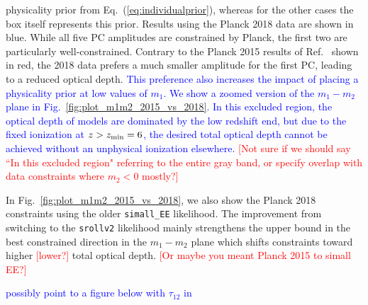 \documentclass[prd,twocolumn,amsmath,amssymb,floatfix,superscriptaddress,nofootinbib]{revtex4-1}
\newcommand{\wh}[1]{\textcolor{blue}{#1}}
\newcommand{\ch}[1]{\textcolor{red}{#1}}
\begin{document}
physicality prior from Eq.~(\ref{eq:individualprior}), whereas for the other cases the box itself represents this prior. Results using the Planck 2018 data are shown in blue. While all five PC amplitudes are  constrained by Planck, the first two are particularly well-constrained. Contrary to the Planck 2015 results of Ref.~\cite{Heinrich:2016ojb} shown in red, the 2018 data prefers a much smaller amplitude for the first PC, leading to a reduced optical depth.  \wh{This preference also increases the impact of placing a physicality prior at low values of $m_1$.
We show a zoomed version of the $m_1-m_2$ plane in Fig.~\ref{fig:plot_m1m2_2015_vs_2018}.
In this excluded region, the optical depth of models are dominated by the low redshift end, but due to the fixed ionization at $z>z_{\rm min}=6$, the desired total optical depth cannot be achieved without an unphysical ionization elsewhere.} \ch{[Not sure if we should say ``In this excluded region" referring to the entire gray band, or specify overlap with data constraints where $m_2 < 0$ mostly?]}

In Fig.~\ref{fig:plot_m1m2_2015_vs_2018}, we also show
the Planck 2018 constraints using the older \texttt{simall\_EE} likelihood.  The improvement 
from switching to the \texttt{srollv2} likelihood mainly strengthens the upper bound in the best constrained direction in the $m_1-m_2$ plane which shifts constraints toward higher \ch{[lower?]} total optical depth. \ch{[Or maybe you meant Planck 2015 to simall EE?]}

\wh{possibly point to a figure below with $\tau_{12}$ in}

\end{document}
